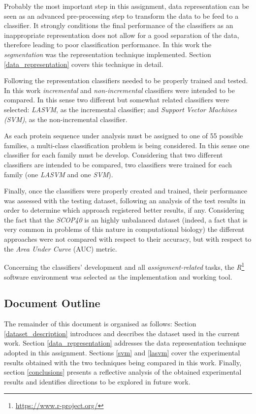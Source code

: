 \documentclass[11pt]{article}
\begin{document}
Probably the most important step in this assignment, data representation can be seen as an advanced pre-processing step to transform the data to be feed to a classifier. It strongly conditions the final performance of the classifiers as an inappropriate representation does not allow for a good separation of the data, therefore leading to poor classification performance. In this work the \emph{segmentation} was the representation technique implemented. Section \ref{data_representation} covers this technique in detail.

Following the representation classifiers needed to be properly trained and tested. In this work \emph{incremental} and \emph{non-incremental} classifiers were intended to be compared. In this sense two different but somewhat related classifiers were selected: \emph{LASVM}, as the incremental classifier; and \emph{Support Vector Machines (SVM)}, as the non-incremental classifier.

As each protein sequence under analysis must be assigned to one of 55 possible families, a multi-class classification problem is being considered. In this sense one classifier for each family must be develop. Considering that two different classifiers are intended to be compared, two classifiers were trained for each family (one \emph{LASVM} and one \emph{SVM}).

Finally, once the classifiers were properly created and trained, their performance was assessed with the testing dataset, following an analysis of the test results in order to determine which approach registered better results, if any. Considering the fact that the \emph{SCOP40} is an highly unbalanced dataset (indeed, a fact that is very common in problems of this nature in computational biology) the different approaches were not compared with respect to their accuracy, but with respect to the \emph{Area Under Curve} (AUC) metric.

Concerning the classifiers' development and all \emph{assignment-related} tasks, the \emph{R}\footnote{\url{https://www.r-project.org/}} software environment was selected as the implementation and working tool.

\subsection{Document Outline}

The remainder of this document is organised as follows: Section \ref{dataset_description} introduces and describes the dataset used in the current work. Section \ref{data_representation} addresses the data representation technique adopted in this assignment. Sections \ref{svm} and \ref{lasvm} cover the experimental results obtained with the two techniques being compared in this work. Finally, section \ref{conclusions} presents a reflective analysis of the obtained experimental results and identifies directions to be explored in future work.
\end{document}
